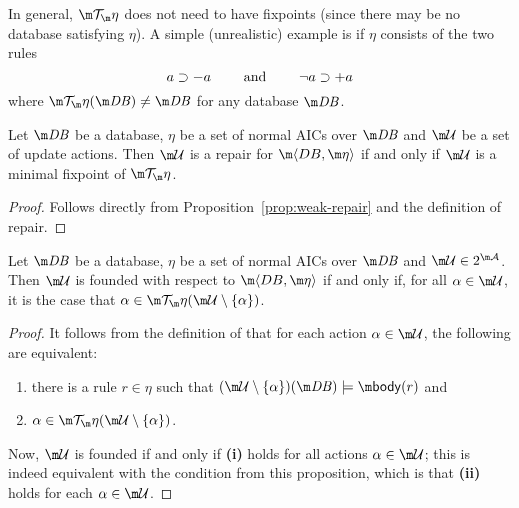 \begin{example}
  In general, $\Op$ does not need to have fixpoints (since there may be no database satisfying $\eta$).
  A simple (unrealistic) example is if $\eta$ consists of the two rules
  \[a\supset-a \qquad \mbox{ and } \qquad \neg a\supset +a\]
  where $\Op(\db)\neq\db$ for any database $\db$.
\end{example}

\begin{proposition}
  \label{prop:repair}
  Let $\db$ be a database, $\eta$ be a set of normal AICs over $\db$ and $\UU$ be a set of update actions.
  Then $\UU$ is a repair for $\fulldb$ if and only if $\UU$ is a minimal fixpoint of $\Op$.
\end{proposition}
\begin{proof}
  Follows directly from Proposition~\ref{prop:weak-repair} and the definition of repair.
\end{proof}

\begin{proposition}
  \label{prop:founded-char}
  Let $\db$ be a database, $\eta$ be a set of normal AICs over $\db$ and $\UU\in 2^{\acts}$. %
  Then $\UU$ is founded with respect to $\fulldb$ if and only if, for all $\alpha\in\UU$, it is the case that $\alpha\in\Op(\UU\setminus\{\alpha\})$.
\end{proposition}
\begin{proof}
  It follows from the definition of \Op that for each action $\alpha\in \UU$, the following are equivalent:
  \begin{enumerate}
   \item there is a rule $r\in\eta$ such that $(\UU\setminus\{\alpha\})(\db)\models\body(r)$ and 
   \item $\alpha\in\Op(\UU\setminus\{\alpha\})$.
  \end{enumerate}
  Now, $\UU$ is founded if and only if \textbf{(i)} holds for all actions $\alpha\in \UU$; this is indeed equivalent with the condition from this proposition, which is that \textbf{(ii)} holds for each $\alpha\in \UU$. 
\end{proof} 

